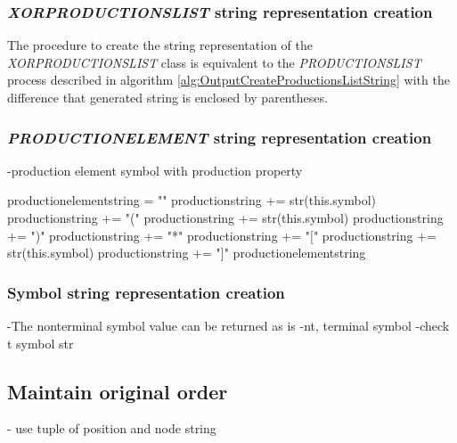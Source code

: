\subsubsection{\textit{XOR\textunderscore PRODUCTIONS\textunderscore LIST} string representation creation}
The procedure to create the string representation of the \textit{XOR\textunderscore PRODUCTIONS\textunderscore LIST} class is equivalent to the \textit{PRODUCTIONS\textunderscore LIST} process described in algorithm \ref{alg:OutputCreateProductionsListString} with the difference that generated string is enclosed by parentheses.
\subsubsection{\textit{PRODUCTION\textunderscore ELEMENT} string representation creation}

-production element symbol with production property 

\begin{algorithm}[H]
\caption{\textit{PRODUCTION\textunderscore ELEMENT}  string creation}
\label{alg:OutputCreateProductionElementString}
\begin{algorithmic}[1]
\State production\textunderscore element\textunderscore string = ""
		\State production\textunderscore string += str(this.symbol)
		\State production\textunderscore string += "("
		\State production\textunderscore string += str(this.symbol)
		\State production\textunderscore string += ")"
		\State production\textunderscore string += "*"
		\State production\textunderscore string += "["
		\State production\textunderscore string += str(this.symbol)
		\State production\textunderscore string += "]"
	\EndIf
\State production\textunderscore element\textunderscore string
\end{algorithmic}
\end{algorithm}

\subsubsection{Symbol string representation creation}
-The nonterminal symbol value can be returned as is
-nt, terminal symbol
-check t symbol str

\subsection{Maintain original order}\label{sec:ImplementationOutputGrammarGraphMaintainOrder}
- use tuple of position and node string


